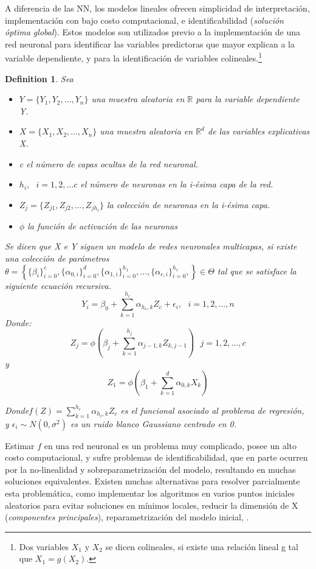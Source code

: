 \documentclass[nojss]{jss}
\newtheorem{Def}{Definition}
\begin{document}
 
A diferencia de las NN, los modelos lineales ofrecen simplicidad de interpretación, implementación con bajo costo computacional, e identificabilidad (\textit{solución óptima global}). Estos modelos son utilizados previo a la implementación de una red neuronal para identificar las variables predictoras que mayor explican a la variable dependiente, y para la identificación de variables colineales.\footnote{Dos variables $X_1$ y $X_2$ se dicen colineales, si existe una relación lineal g tal que $X_1 = g(X_2)$.}

\begin{Def}
	Sea
	\begin{itemize}
		\item $Y = \{Y_1,Y_2,\ldots,Y_n\}$ una muestra aleatoria en $\mathbb{R}$ para la variable dependiente Y.
		\item $X = \{X_1,X_2,\ldots,X_n\}$ una muestra aleatoria en $\mathbb{R}^d$ de las variables explicativas X.
		\item  c el número de capas ocultas de la red neuronal.
		\item $h_i,\text{ } i = 1,2,\ldots c$ el número de neuronas  en la i-ésima capa de la red.
		\item $Z_j = \{Z_{j1},Z_{j2},\ldots, Z_{jh_i}\}$ la colección de neuronas en la i-ésima capa.
		\item $\phi$ la función de activación de las neuronas
	\end{itemize}
	 
	Se dicen que X e Y siguen un modelo de redes neuronales multicapas, si existe una colección de parámetros $\theta = \left\{ \{\beta_i\}_{i=0}^{c},\{\alpha_{0,i}\}_{i=0}^{d},\{\alpha_{1,i}\}_{i=0}^{h_1},\ldots, \{\alpha_{c,i}\}_{i=0}^{h_c}, \right\} \in \Theta$ tal que se satisface la siguiente ecuación recursiva.
	$$Y_i = \beta_{0} + \sum_{k=1}^{h_c} \alpha_{h_c,k} Z_c +\epsilon_i, \text{ } i = 1,2,\ldots,n$$
	Donde: 
	$$Z_{j} = \phi\left(\beta_j +\sum_{k=1}^{h_j}\alpha_{j-1,k}Z_{k,j-1}\right)\text{ } j = 1,2,\ldots,c$$
	y 
	$$Z_{1} = \phi\left(\beta_1 +\sum_{k=1}^{d}\alpha_{0,k}X_{k}\right) $$
	
	Donde$f(Z) = \sum_{k=1}^{h_c} \alpha_{h_c,k} Z_c$ es el funcional asociado al problema de regresión, y  $\epsilon_i \sim N(0,\sigma^2)$ es un ruido blanco Gaussiano centrado en 0.
\end{Def}

Estimar $f$ en una red neuronal es un problema muy complicado, posee un alto costo computacional, y sufre problemas de identificabilidad, que en parte ocurren por la no-linealidad y sobreparametrización del modelo, resultando en muchas soluciones equivalentes. Existen muchas alternativas para resolver parcialmente esta problemática, como implementar los algoritmos en varios puntos iniciales aleatorios para evitar soluciones en mínimos locales, reducir la dimensión de X (\textit{componentes principales}), reparametrización del modelo inicial, \cite{Arya2017}.\\
\end{document}
